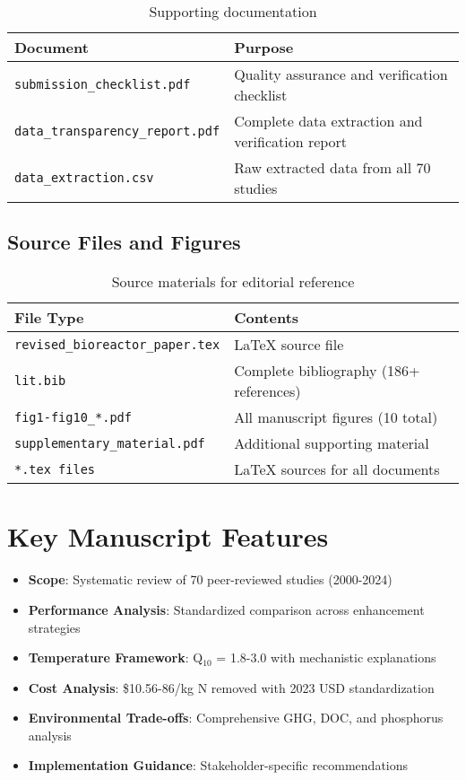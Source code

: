 \documentclass[12pt,a4paper]{article}
\begin{document}
\begin{table}[h]
\centering
\begin{tabular}{>{\raggedright\arraybackslash}p{7cm} >{\raggedright\arraybackslash}p{7cm}}
\toprule
\textbf{Document} & \textbf{Purpose} \\
\midrule
\texttt{submission\_checklist.pdf} & Quality assurance and verification checklist \\
\texttt{data\_transparency\_report.pdf} & Complete data extraction and verification report \\
\texttt{data\_extraction.csv} & Raw extracted data from all 70 studies \\
\bottomrule
\end{tabular}
\caption{Supporting documentation}
\end{table}

\subsection{Source Files and Figures}

\begin{table}[h]
\centering
\begin{tabular}{>{\raggedright\arraybackslash}p{7cm} >{\raggedright\arraybackslash}p{7cm}}
\toprule
\textbf{File Type} & \textbf{Contents} \\
\midrule
\texttt{revised\_bioreactor\_paper.tex} & LaTeX source file \\
\texttt{lit.bib} & Complete bibliography (186+ references) \\
\texttt{fig1-fig10\_*.pdf} & All manuscript figures (10 total) \\
\texttt{supplementary\_material.pdf} & Additional supporting material \\
\texttt{*.tex files} & LaTeX sources for all documents \\
\bottomrule
\end{tabular}
\caption{Source materials for editorial reference}
\end{table}

\section{Key Manuscript Features}

\begin{itemize}[leftmargin=*]
\item \textbf{Scope}: Systematic review of 70 peer-reviewed studies (2000-2024)
\item \textbf{Performance Analysis}: Standardized comparison across enhancement strategies
\item \textbf{Temperature Framework}: Q$_{10}$ = 1.8-3.0 with mechanistic explanations  
\item \textbf{Cost Analysis}: \$10.56-86/kg N removed with 2023 USD standardization
\item \textbf{Environmental Trade-offs}: Comprehensive GHG, DOC, and phosphorus analysis
\item \textbf{Implementation Guidance}: Stakeholder-specific recommendations
\end{itemize}
\end{document}
